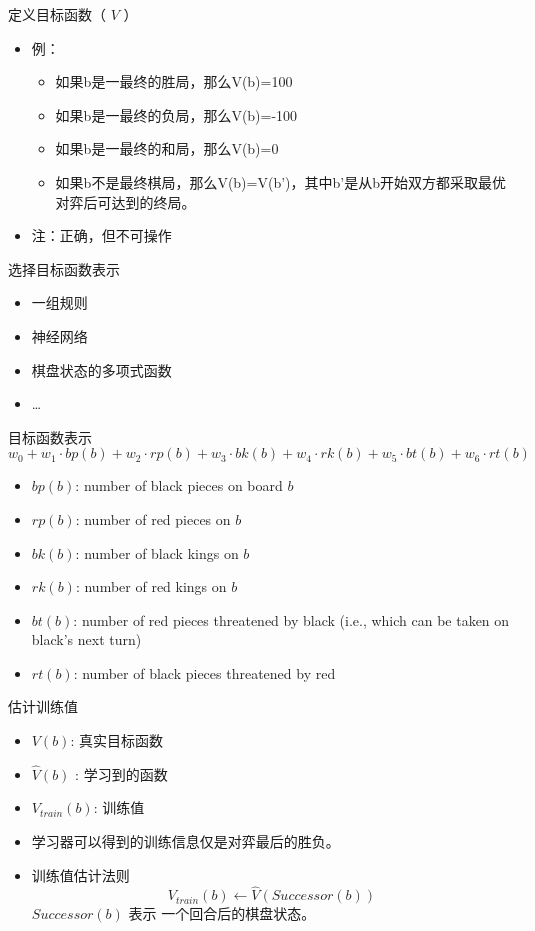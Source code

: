\documentclass[presentation]{beamer}
\begin{document}
\begin{frame}[label={sec:org3c2ae42}]{定义目标函数（ \(V\) ）}
\begin{itemize}
\item 例：
\begin{itemize}
\item 如果b是一最终的胜局，那么V(b)=100
\item 如果b是一最终的负局，那么V(b)=-100
\item 如果b是一最终的和局，那么V(b)=0
\item 如果b不是最终棋局，那么V(b)=V(b')，其中b'是从b开始双方都采取最优对弈后可达到的终局。
\end{itemize}
\item 注：正确，但不可操作
\end{itemize}
\end{frame}

\begin{frame}[label={sec:org9125cff}]{选择目标函数表示}
\begin{itemize}
\item 一组规则
\item 神经网络
\item 棋盘状态的多项式函数
\item \ldots{}
\end{itemize}
\end{frame}

\begin{frame}[label={sec:org22d1385}]{目标函数表示}
\[ w_{0} + w_{1}\cdot bp(b) + w_{2}\cdot rp(b) + w_{3}\cdot bk(b) + w_{4}\cdot rk(b) + w_{5}\cdot bt(b) + w_{6}\cdot rt(b) \]

\begin{itemize}
\item \(bp(b)\): number of black pieces on board \(b\)
\item \(rp(b)\): number of red pieces on \(b\)
\item \(bk(b)\): number of black kings on \(b\)
\item \(rk(b)\): number of red kings on \(b\)
\item \(bt(b)\): number of red pieces threatened by black (i.e., which can be taken
on black's next turn)
\item \(rt(b)\):  number of black pieces threatened by red
\end{itemize}
\end{frame}

\begin{frame}[label={sec:orgb4f30b6}]{估计训练值}
\begin{itemize}
\item \(V(b)\): 真实目标函数
\item \(\hat{V}(b)\) : 学习到的函数
\item \(V_{train}(b)\): 训练值

\item 学习器可以得到的训练信息仅是对弈最后的胜负。
\item 训练值估计法则 
$$V_{train}(b) \leftarrow \hat{V}(Successor(b))$$
\(Successor(b)\) 表示 一个回合后的棋盘状态。
\end{itemize}
\end{frame}
\end{document}
